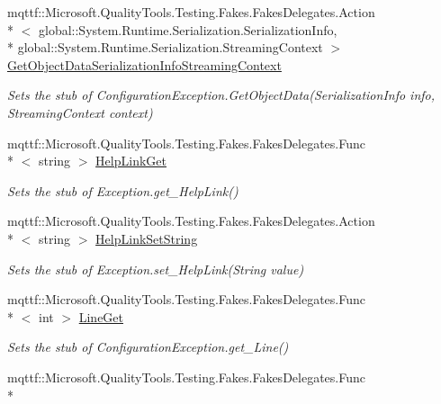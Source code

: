 \begin{DoxyCompactItemize}
mqttf\-::\-Microsoft.\-Quality\-Tools.\-Testing.\-Fakes.\-Fakes\-Delegates.\-Action\\*
$<$ global\-::\-System.\-Runtime.\-Serialization.\-Serialization\-Info, \\*
global\-::\-System.\-Runtime.\-Serialization.\-Streaming\-Context $>$ \hyperlink{class_system_1_1_configuration_1_1_fakes_1_1_stub_configuration_exception_a8ffec35fd7aaf4fbf33ed74222056d41}{Get\-Object\-Data\-Serialization\-Info\-Streaming\-Context}
\begin{DoxyCompactList}\small\item\em Sets the stub of Configuration\-Exception.\-Get\-Object\-Data(\-Serialization\-Info info, Streaming\-Context context)\end{DoxyCompactList}\item 
mqttf\-::\-Microsoft.\-Quality\-Tools.\-Testing.\-Fakes.\-Fakes\-Delegates.\-Func\\*
$<$ string $>$ \hyperlink{class_system_1_1_configuration_1_1_fakes_1_1_stub_configuration_exception_a77082bc1d39478867f3b2c9a7f73de90}{Help\-Link\-Get}
\begin{DoxyCompactList}\small\item\em Sets the stub of Exception.\-get\-\_\-\-Help\-Link()\end{DoxyCompactList}\item 
mqttf\-::\-Microsoft.\-Quality\-Tools.\-Testing.\-Fakes.\-Fakes\-Delegates.\-Action\\*
$<$ string $>$ \hyperlink{class_system_1_1_configuration_1_1_fakes_1_1_stub_configuration_exception_a377875ecb918bc62dfbba12fd66ba51a}{Help\-Link\-Set\-String}
\begin{DoxyCompactList}\small\item\em Sets the stub of Exception.\-set\-\_\-\-Help\-Link(\-String value)\end{DoxyCompactList}\item 
mqttf\-::\-Microsoft.\-Quality\-Tools.\-Testing.\-Fakes.\-Fakes\-Delegates.\-Func\\*
$<$ int $>$ \hyperlink{class_system_1_1_configuration_1_1_fakes_1_1_stub_configuration_exception_a9ee9667e25ce1b2e225aa576f1f2de66}{Line\-Get}
\begin{DoxyCompactList}\small\item\em Sets the stub of Configuration\-Exception.\-get\-\_\-\-Line()\end{DoxyCompactList}\item 
mqttf\-::\-Microsoft.\-Quality\-Tools.\-Testing.\-Fakes.\-Fakes\-Delegates.\-Func\\*

\end{DoxyCompactItemize}
